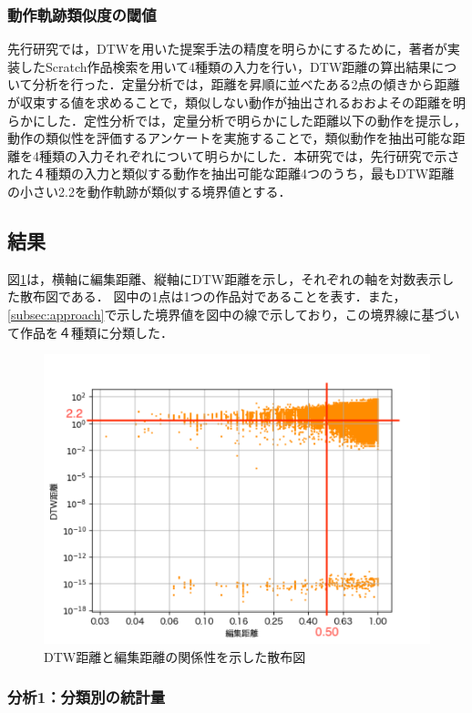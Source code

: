 \documentclass[T,J]{fose} %
\begin{document}
\subsubsection{動作軌跡類似度の閾値}
先行研究では，DTWを用いた提案手法の精度を明らかにするために，著者が実装したScratch作品検索を用いて4種類の入力を行い，DTW距離の算出結果について分析を行った．定量分析では，距離を昇順に並べたある2点の傾きから距離が収束する値を求めることで，類似しない動作が抽出されるおおよその距離を明らかにした．定性分析では，定量分析で明らかにした距離以下の動作を提示し，動作の類似性を評価するアンケートを実施することで，類似動作を抽出可能な距離を4種類の入力それぞれについて明らかにした．本研究では，先行研究で示された４種類の入力と類似する動作を抽出可能な距離4つのうち，最もDTW距離の小さい2.2を動作軌跡が類似する境界値とする．
\subsection{結果}

図\ref{fig:out-nolimit}は，横軸に編集距離、縦軸にDTW距離を示し，それぞれの軸を対数表示した散布図である．
図中の1点は1つの作品対であることを表す．また，\ref{subsec:approach}で示した境界値を図中の線で示しており，この境界線に基づいて作品を４種類に分類した．

\begin{figure}[t]
	\centering
	\includegraphics[width=1.0\linewidth]{Okamoto_fig/out-all-nolimit.pdf}
	\caption{DTW距離と編集距離の関係性を示した散布図}
	\label{fig:out-nolimit}
\end{figure}

\subsubsection{分析1：分類別の統計量}
\end{document}
